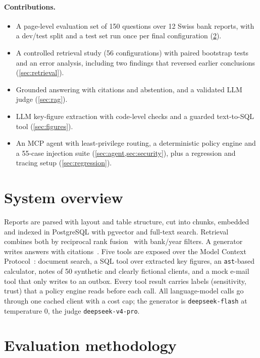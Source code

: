 \documentclass[10pt,a4paper]{article}
\begin{document}
\paragraph{Contributions.}
\begin{itemize}
  \item A page-level evaluation set of 150 questions over 12 Swiss bank reports, with a dev/test split and a
        test set run once per final configuration (\cref{sec:eval}).
  \item A controlled retrieval study (56 configurations) with paired bootstrap tests and an error analysis,
        including two findings that reversed earlier conclusions (\cref{sec:retrieval}).
  \item Grounded answering with citations and abstention, and a validated LLM judge (\cref{sec:rag}).
  \item LLM key-figure extraction with code-level checks and a guarded text-to-SQL tool (\cref{sec:figures}).
  \item An MCP agent with least-privilege routing, a deterministic policy engine and a 55-case injection suite
        (\cref{sec:agent,sec:security}), plus a regression and tracing setup (\cref{sec:regression}).
\end{itemize}

\section{System overview}\label{sec:system}
Reports are parsed with layout and table structure, cut into chunks, embedded and indexed in PostgreSQL with
pgvector and full-text search. Retrieval combines both by reciprocal rank fusion~\citep{cormack2009rrf} with
bank/year filters. A generator writes answers with citations~\citep{lewis2020rag}. Five tools are exposed over
the Model Context Protocol~\citep{mcp2024}: document search, a SQL tool over extracted key figures, an
\texttt{ast}-based calculator, notes of 50 synthetic and clearly fictional clients, and a mock e-mail tool that
only writes to an outbox. Every tool result carries labels (sensitivity, trust) that a policy engine reads
before each call. All language-model calls go through one cached client with a cost cap; the generator is
\texttt{deepseek-flash} at temperature 0, the judge \texttt{deepseek-v4-pro}.

\section{Evaluation methodology}\label{sec:eval}
\end{document}
